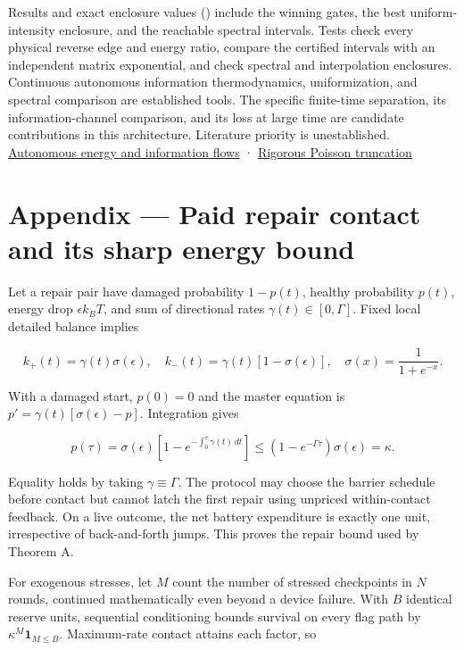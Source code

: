 \documentclass[
  11pt,
]{article}
\begin{document}
Results and exact enclosure values ()
include the winning gates, the best uniform-intensity enclosure, and the
reachable spectral intervals. Tests check every physical reverse edge
and energy ratio, compare the certified intervals with an independent
matrix exponential, and check spectral and interpolation enclosures.
Continuous autonomous information thermodynamics, uniformization, and
spectral comparison are established tools. The specific finite-time
separation, its information-channel comparison, and its loss at large
time are candidate contributions in this architecture. Literature
priority is unestablished.
\href{https://arxiv.org/abs/2209.10644}{Autonomous energy and
information flows} ·
\href{https://web.stanford.edu/~glynn/papers/1988/FG88.html}{Rigorous
Poisson truncation}

\section{Appendix --- Paid repair contact and its sharp energy
bound}\label{appendix-paid-repair-contact-and-its-sharp-energy-bound}

Let a repair pair have damaged probability \(1-p(t)\), healthy
probability \(p(t)\), energy drop \(\epsilon k_BT\), and sum of
directional rates \(\gamma(t)\in[0,\Gamma]\). Fixed local detailed
balance implies

\[
k_+(t)=\gamma(t)\sigma(\epsilon),\quad
k_-(t)=\gamma(t)[1-\sigma(\epsilon)],\quad
\sigma(x)=\frac1{1+e^{-x}}.
\]

With a damaged start, \(p(0)=0\) and the master equation is
\(p'=\gamma(t)[\sigma(\epsilon)-p]\). Integration gives

\[
p(\tau)=\sigma(\epsilon)\left[1-e^{-\int_0^\tau\gamma(t)\,dt}\right]
\le(1-e^{-\Gamma\tau})\sigma(\epsilon)=\kappa.
\]

Equality holds by taking \(\gamma\equiv\Gamma\). The protocol may choose
the barrier schedule before contact but cannot latch the first repair
using unpriced within-contact feedback. On a live outcome, the net
battery expenditure is exactly one unit, irrespective of back-and-forth
jumps. This proves the repair bound used by Theorem A.

For exogenous stresses, let \(M\) count the number of stressed
checkpoints in \(N\) rounds, continued mathematically even beyond a
device failure. With \(B\) identical reserve units, sequential
conditioning bounds survival on every flag path by
\(\kappa^M\mathbf1_{M\le B}\). Maximum-rate contact attains each factor,
so
\end{document}

